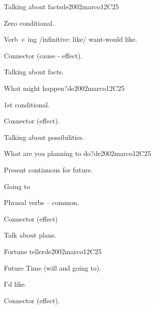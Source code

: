 \begin{syllabus}
\begin{unit}{Talking about facts}{}{de2002marco}{12}{C25}
   \begin{topics}
      \item Zero conditional.
      \item Verb + ing /infinitive: like/ want-would like.
      \item Connector (cause - effect).
   \end{topics}

   \begin{learningoutcomes}
      \item Talking about facts.
   \end{learningoutcomes}
\end{unit}

\begin{unit}{What might happen?}{}{de2002marco}{12}{C25}
   \begin{topics}
      \item 1st conditional.
      \item Connector (effect).
   \end{topics}

   \begin{learningoutcomes}
      \item Talking about possibilities.
   \end{learningoutcomes}
\end{unit}

\begin{unit}{What are you planning to do?}{}{de2002marco}{12}{C25}
   \begin{topics}
      \item Present continuous for future.
      \item Going to 
      \item Phrasal verbs – common.
      \item Connector (effect)
   \end{topics}

   \begin{learningoutcomes}
      \item Talk about plans.
   \end{learningoutcomes}
\end{unit}

\begin{unit}{Fortune teller}{}{de2002marco}{12}{C25}
   \begin{topics}
      \item Future Time (will and going to).
      \item I’d like.
      \item Connector (effect).
   \end{topics}


\end{unit}
\end{syllabus}
